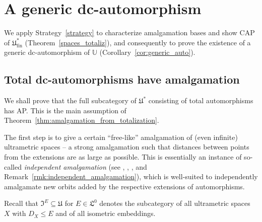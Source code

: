 \documentclass[10pt,a4paper]{article}
\theoremstyle{definition}
\theoremstyle{remark}
\newcommand \subs {\subseteq}
\newcommand \U {\mathbb{U}}
\newcommand \fin {{\operatorname{fin}}}
\newcommand \Lin {\mathfrak{L}}
\newcommand \Ult {\mathfrak{U}}
\newcommand \UltIso {\mathfrak{I}}
\begin{document}
\section{A generic dc-automorphism}


We apply Strategy~\ref{strategy} to characterize amalgamation bases and show CAP of $\Ult^*_\fin$ (Theorem~\ref{spaces_totaliz}), and consequently to prove the existence of a generic dc-automorphism of $\U$ (Corollary~\ref{cor:generic_auto}).


\subsection{Total dc-automorphisms have amalgamation}

We shall prove that the full subcategory of $\Ult^*$ consisting of total automorphisms has AP.
This is the main assumption of Theorem~\ref{thm:amalgamation_from_totalization}.

The first step is to give a certain ``free-like'' amalgamation of (even infinite) ultrametric spaces – a strong amalgamation such that distances between points from the extensions are as large as possible.
This is essentially an instance of so-called \emph{independent amalgamation} (see \cite[Section~3]{Solecki05}, \cite[Section~2]{DouchaMalicki19}, \cite[Definition~2.3]{Sabok19}, and Remark~\ref{rmk:independent_amalgamation}), which is well-suited to independently amalgamate new orbits added by the respective extensions of automorphisms.

\medskip

Recall that $\UltIso^E \subs \Ult$ for $E \in \Lin^0$ denotes the subcategory of all ultrametric spaces $X$ with $D_X \leq E$ and of all isometric embeddings.
\end{document}
